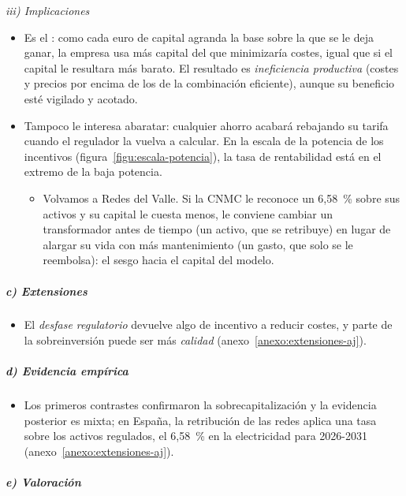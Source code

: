 \documentclass[11pt]{article}
\begin{document}
\hspace*{3.6em}\emph{iii) Implicaciones}

\begin{itemize}
\item Es el : como cada euro de capital agranda la base sobre la que se le deja ganar, la empresa usa más capital del que minimizaría costes, igual que si el capital le resultara más barato. El resultado es \emph{ineficiencia productiva} (costes y precios por encima de los de la combinación eficiente), aunque su beneficio esté vigilado y acotado.
\item Tampoco le interesa abaratar: cualquier ahorro acabará rebajando su tarifa cuando el regulador la vuelva a calcular. En la escala de la potencia de los incentivos (figura~\ref{figu:escala-potencia}), la tasa de rentabilidad está en el extremo de la baja potencia.
  \begin{itemize}
  \item Volvamos a Redes del Valle. Si la CNMC le reconoce un 6,58~\% sobre sus activos y su capital le cuesta menos, le conviene cambiar un transformador antes de tiempo (un activo, que se retribuye) en lugar de alargar su vida con más mantenimiento (un gasto, que solo se le reembolsa): el sesgo hacia el capital del modelo.
  \end{itemize}
\end{itemize}

\subparagraph{c) Extensiones}

\begin{itemize}
\item El \emph{desfase regulatorio} devuelve algo de incentivo a reducir costes, y parte de la sobreinversión puede ser más \emph{calidad} (anexo~\ref{anexo:extensiones-aj}).
\end{itemize}

\subparagraph{d) Evidencia empírica}

\begin{itemize}
\item Los primeros contrastes confirmaron la sobrecapitalización y la evidencia posterior es mixta\nocite{Spann1974Rate,Joskow1974Inflation}; en España, la retribución de las redes aplica una tasa sobre los activos regulados, el 6,58~\% en la electricidad para 2026-2031\nocite{CNMC2025Circular9} (anexo~\ref{anexo:extensiones-aj}).
\end{itemize}

\subparagraph{e) Valoración}
\end{document}
